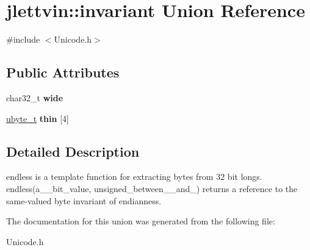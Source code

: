 \hypertarget{unionjlettvin_1_1invariant}{}\section{jlettvin\+:\+:invariant Union Reference}
\label{unionjlettvin_1_1invariant}


{\ttfamily \#include $<$Unicode.\+h$>$}

\subsection*{Public Attributes}
\begin{DoxyCompactItemize}
\item 
\hypertarget{unionjlettvin_1_1invariant_a56455ef5ec145c1b92a13e905ccc9f2b}{}char32\+\_\+t {\bfseries wide}\label{unionjlettvin_1_1invariant_a56455ef5ec145c1b92a13e905ccc9f2b}

\item 
\hypertarget{unionjlettvin_1_1invariant_a7eb26a50282b4c9d80bf0d3004b545c7}{}\hyperlink{namespacejlettvin_a7c7cf84f4fd67858c46a1077ed2e3ad4}{ubyte\+\_\+t} {\bfseries thin} \mbox{[}4\mbox{]}\label{unionjlettvin_1_1invariant_a7eb26a50282b4c9d80bf0d3004b545c7}

\end{DoxyCompactItemize}


\subsection{Detailed Description}
endless is a template function for extracting bytes from 32 bit longs. endless(a\+\_\+\_\+bit\+\_\+value, unsigned\+\_\+between\+\_\+\_\+and\+\_) returns a reference to the same-\/valued byte invariant of endianness. 

The documentation for this union was generated from the following file\+:\begin{DoxyCompactItemize}
\item 
Unicode.\+h\end{DoxyCompactItemize}
